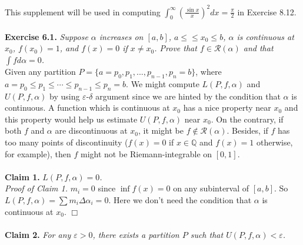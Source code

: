 \documentclass{article}
\begin{document}
This supplement will be used in computing
$\int_0^{\infty} (\frac{\sin x}{x})^2 dx = \frac{\pi}{2}$ in Exercise 8.12. \\\\






\textbf{Exercise 6.1.}
\emph{Suppose $\alpha$ increases on $[a, b]$, $a \leq ≤ x_0 \leq b$,
$\alpha$ is continuous at $x_0$, $f(x_0) = 1$, and $f(x) = 0$ if $x \neq x_0$.
Prove that $f \in \mathscr{R}(\alpha)$ and that $\int f d \alpha = 0$.} \\

Given any partition $P = \{a = p_0, p_1, ..., p_{n-1}, p_n = b \}$,
where $a = p_0 \leq p_1 \leq \cdots \leq p_{n-1} \leq p_n = b$.
We might compute $L(P, f, \alpha)$ and $U(P, f, \alpha)$ by using $\varepsilon$-$\delta$ argument
since we are hinted by the condition that $\alpha$ is continuous.
A function which is continuous at $x_0$ has a nice property near $x_0$
and this property would help us estimate $U(P, f, \alpha)$ near $x_0$.
On the contrary, if both $f$ and $\alpha$ are discontinuous at $x_0$,
it might be $f \not\in \mathscr{R}(\alpha)$.
Besides, if $f$ has too many points of discontinuity
($f(x) = 0$ if $x \in \mathbb{Q}$ and $f(x) = 1$ otherwise, for example),
then $f$ might not be Riemann-integrable on $[0, 1]$. \\\\



\textbf{Claim 1.}
\emph{$L(P, f, \alpha) = 0$.} \\

\emph{Proof of Claim 1.}
$m_i = 0$ since $\inf f(x) = 0$ on any subinterval of $[a, b]$.
So $L(P, f, \alpha) = \sum m_i \Delta \alpha_i = 0$.
Here we don't need the condition that $\alpha$ is continuous at $x_0$.
$\Box$ \\\\



\textbf{Claim 2.}
\emph{For any $\varepsilon > 0$,
there exists a partition $P$ such that $U(P, f, \alpha) < \varepsilon$.} \\
\end{document}
